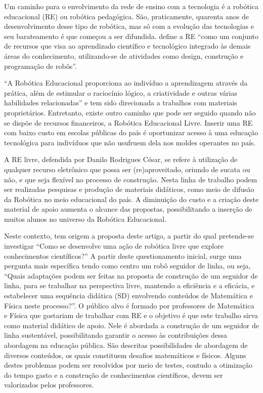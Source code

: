 \documentclass{textolivre}
\begin{document}
Um caminho para o envolvimento da rede de ensino com a tecnologia é a robótica
educacional (RE) ou robótica pedagógica. São, praticamente, quarenta anos de
desenvolvimento desse tipo de robótica, mas só com a evolução das tecnologias e
seu barateamento é que começou a ser difundida. \textcite[p. 41]{lopes2008} define a RE
“como um conjunto de recursos que visa ao aprendizado científico e tecnológico
integrado às demais áreas do conhecimento, utilizando-se de atividades como
design, construção e programação de robôs”.

“A Robótica Educacional proporciona ao indivíduo a aprendizagem através da
prática, além de estimular o raciocínio lógico, a criatividade e outras várias
habilidades relacionadas” \cite[p. 76]{silva2016} e
tem sido direcionada a trabalhos com materiais proprietários. Entretanto,
existe outro caminho que pode ser seguido quando não se dispõe de recursos
financeiros, a Robótica Educacional Livre. Inserir uma RE com baixo custo em
escolas públicas do país é oportunizar acesso à uma educação tecnológica para
indivíduos que não usufruem dela nos moldes operantes no país.

A RE livre, defendida por Danilo Rodrigues César, se refere à utilização de
qualquer recurso eletrônico que possa ser (re)aproveitado, oriundo de sucata ou
não, e que seja flexível no processo de construção. Nesta linha de trabalho
podem ser realizadas pesquisas e produção de materiais didáticos, como meio de
difusão da Robótica no meio educacional do país. A diminuição do custo e a
criação deste material de apoio aumenta o alcance das propostas, possibilitando
a inserção de muitos alunos no universo da Robótica Educacional.

Neste contexto, tem origem a proposta deste artigo, a partir do qual
pretende-se investigar “Como se desenvolve uma ação de robótica livre que
explore conhecimentos científicos?” A partir deste questionamento inicial,
surge uma pergunta mais específica tendo como centro um robô seguidor de linha,
ou seja, “Quais adaptações podem ser feitas na proposta de construção de um
seguidor de linha, para se trabalhar na perspectiva livre, mantendo a
eficiência e a eficácia, e estabelecer uma sequência didática (SD) envolvendo
conteúdos de Matemática e Física neste processo?”. O público alvo é formado por
professores de Matemática e Física que gostariam de trabalhar com RE e o
objetivo é que este trabalho sirva como material didático de apoio. Nele é
abordada a construção de um seguidor de linha sustentável, possibilitando
garantir o acesso às contribuições dessa abordagem na educação pública. São
descritas possibilidades de abordagem de diversos conteúdos, os quais
constituem desafios matemáticos e físicos. Alguns destes problemas podem ser
resolvidos por meio de testes, contudo a otimização do tempo gasto e a
construção de conhecimentos científicos, devem ser valorizados pelos
professores.
\end{document}
